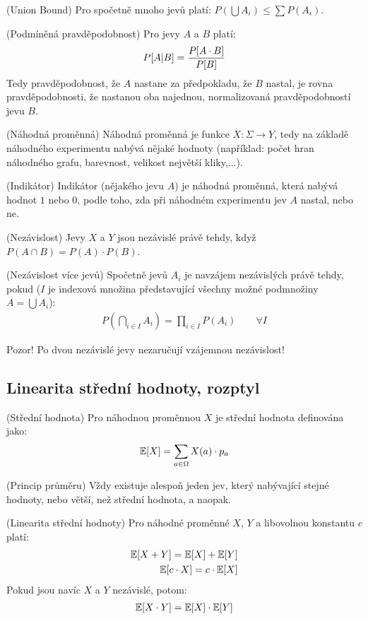 \tv (Union Bound) Pro spočetně mnoho jevů platí: $P(\bigcup A_i) \leq \sum 
P(A_i)$.

\df (Podmíněná pravděpodobnost) Pro jevy $A$ a $B$ platí:
\begin{align}
	P[A|B] = {P[A \cdot B] \over P[B]}
\end{align}
Tedy pravděpodobnost, že $A$ nastane za předpokladu, že $B$ nastal, je rovna 
pravděpodobnosti, že nastanou oba najednou, normalizovaná pravděpodobností jevu 
$B$.

\df (Náhodná proměnná) Náhodná proměnná je funkce $X: \Sigma \to Y$, tedy na 
základě náhodného experimentu nabývá nějaké hodnoty (například: počet hran 
náhodného grafu, barevnost, velikost největší kliky,...).

\df (Indikátor) Indikátor (nějakého jevu $A$) je náhodná proměnná, která nabývá 
hodnot $1$ nebo $0$, podle toho, zda při náhodném experimentu jev $A$ nastal, 
nebo ne.

\df (Nezávislost) Jevy $X$ a $Y$ jsou nezávislé právě tehdy, když $P(A\cap B) = 
P(A) \cdot P(B)$.

\df (Nezávislost více jevů) Spočetně jevů $A_i$ je navzájem nezávislých právě 
tehdy, pokud ($I$ je indexová množina představující všechny možné podmnožiny $A 
= \bigcup A_i$):
\begin{align}
	P\left(\bigcap_{i \in I} A_i\right) = \prod_{i\in I} P(A_i) \qquad \forall I 
\end{align}

\pzn Pozor! Po dvou nezávislé jevy nezaručují vzájemnou nezávislost!

\subsection{Linearita střední hodnoty, rozptyl}

\df (Střední hodnota) Pro náhodnou proměnnou $X$ je střední hodnota definována 
jako:
\begin{align}
	\mathbb{E}[X] = \sum_{a \in \Omega} X(a) \cdot p_a
\end{align}

\vt (Princip průměru) Vždy existuje alespoň jeden jev, který nabývající stejné 
hodnoty, nebo větší, než střední hodnota, a naopak.

\vt (Linearita střední hodnoty) Pro náhodné proměnné $X$, $Y$ a libovolnou 
konstantu $c$ platí:
\begin{align}
	\mathbb{E}[X+Y] = \mathbb{E}[X] + \mathbb{E}[Y] \\
	\mathbb{E}[c \cdot X] = c \cdot \mathbb{E}[X]
\end{align}
Pokud jsou navíc $X$ a $Y$ nezávislé, potom:
\begin{align}
	\mathbb{E}[X \cdot Y] = \mathbb{E}[X] \cdot \mathbb{E}[Y]
\end{align}

